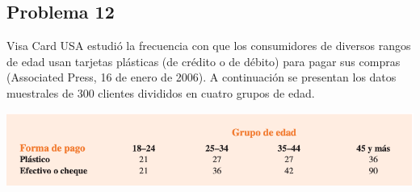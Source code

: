\documentclass[a4paper,12pt]{article}
\begin{document}
\subsection{Problema 12} 

Visa Card USA estudió la frecuencia con que los consumidores de diversos rangos de edad usan tarjetas plásticas (de crédito o de débito) para pagar sus compras (Associated Press, 16 de enero de 2006). A continuación se presentan los datos muestrales de 300 clientes divididos en cuatro grupos de edad.

\begin{center}
    \includegraphics[scale=0.5]{images/Screen Shot 2021-05-10 at 23.28.28.png}
\end{center}
\end{document}
